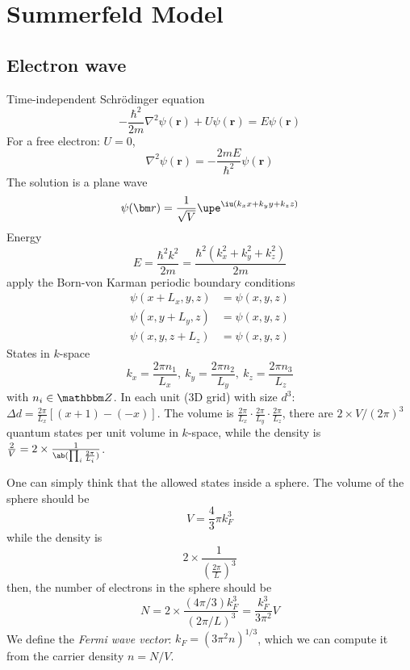\section{Summerfeld Model}

\subsection{Electron wave}

Time-independent Schr\"odinger equation
\begin{equation}
  -\frac{\hbar^2}{2m} \nabla^2 \psi(\bm r) + U\psi(\bm r) = E\psi(\bm r)
\end{equation}
For a free electron: $U = 0$,
\[
  \nabla^2 \psi(\bm r) = -\frac{2mE}{\hbar^2}\psi(\bm r)
\]
The solution is a plane wave
\begin{equation}
  \psi(\bm r) = \frac1{\sqrt V}\upe^{\iu(k_xx+k_yy+k_zz)}
\end{equation}
Energy
\begin{equation}
  E = \frac{\hbar^2k^2}{2m} = \frac{\hbar^2(k_x^2 + k_y^2 + k_z^2)}{2m}
\end{equation}
apply the Born-von Karman periodic boundary conditions
\begin{equation}
  \begin{aligned}
    \psi(x + L_x,y,z) & = \psi(x,y,z)\\
    \psi(x,y + L_y,z) & = \psi(x,y,z)\\
    \psi(x,y,z + L_z) & = \psi(x,y,z)
  \end{aligned}
\end{equation}
States in $k$-space
\begin{equation}
  k_x = \frac{2\pi n_1}{L_x},~
  k_y = \frac{2\pi n_2}{L_y},~
  k_z = \frac{2\pi n_3}{L_z}
\end{equation}
with $n_i \in \mathbbm Z$.
In each unit (3D grid) with size $d^3$: $\Delta d = \frac{2\pi}{L_x}[(x + 1) - (-x)]$.
The volume is $\frac{2\pi}{L_x} \cdot \frac{2\pi}{L_y} \cdot \frac{2\pi}{L_z}$, there are $2 \times V/(2\pi)^3$ quantum states per unit volume in $k$-space, while the density is $\frac2V = 2 \times \frac{1}{\ab(\prod_i\frac{2\pi}{L_i})}$.

One can simply think that the allowed states inside a sphere.
The volume of the sphere should be
\[
  V = \frac43\pi k_F^3
\]
while the density is
\[
  2 \times \frac1{(\frac{2\pi}{L})^3}
\]
then, the number of electrons in the sphere should be
\[
  N = 2 \times \frac{(4\pi/3)k_F^3}{(2\pi/L)^3} = \frac{k_F^3}{3\pi^2}V
\]
We define the \emph{Fermi wave vector}: $k_F = (3\pi^2 n)^{1/3}$, which we can compute it from the carrier density $n = N/V$.


